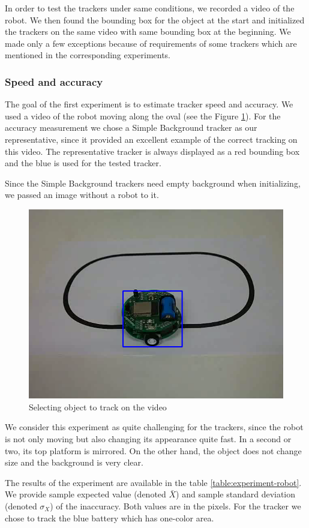 In order to test the trackers under same conditions, we recorded a video of the
robot. We then found the bounding box for the object at the start and
initialized the trackers on the same video with same bounding box at the
beginning. We made only a few exceptions because of requirements of some
trackers which are mentioned in the corresponding experiments.

\subsubsection{Speed and accuracy}

The goal of the first experiment is to estimate tracker speed and accuracy. We
used a video of the robot moving along the oval (see the Figure
\ref{fig:robot-oval}). For the accuracy measurement we chose a Simple
Background tracker as our representative, since it provided an excellent
example of the correct tracking on this video. The representative tracker is
always displayed as a red bounding box and the blue is used for the tested
tracker.

Since the Simple Background trackers need empty background when
initializing, we passed an image without a robot to it.

\begin{figure}
\centering
\includegraphics[width=0.6\linewidth]{img/robot-oval.png}
\caption{Selecting object to track on the video}
\label{fig:robot-oval}
\end{figure}

We consider this experiment as quite challenging for the trackers, since the
robot is not only moving but also changing its appearance quite fast. In a
second or two, its top platform is mirrored. On the other hand, the object does
not change size and the background is very clear.

The results of the experiment are available in the table
\ref{table:experiment-robot}. We provide sample expected value (denoted
$\bar{X}$) and sample standard deviation (denoted $\sigma_X$) of the
inaccuracy. Both values are in the pixels. For the \hsv{} tracker we chose to
track the blue battery which has one-color area.

